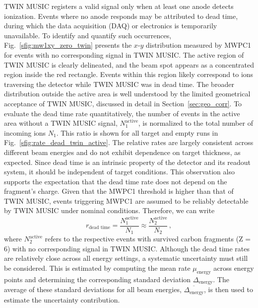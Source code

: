 \begin{appendices}
TWIN MUSIC registers a valid signal only when at least one anode detects ionization. Events where no anode responds may be attributed to dead time, during which the data acquisition (DAQ) or electronics is temporarily unavailable.
To identify and quantify such occurrences, Fig.~\ref{sfig:mw1xy_zero_twin} presents the $x$-$y$ distribution measured by MWPC1 for events with no corresponding signal in TWIN MUSIC. The active region of TWIN MUSIC is clearly delineated, and the beam spot appears as a concentrated region inside the red rectangle. Events within this region likely correspond to ions traversing the detector while TWIN MUSIC was in dead time. The broader distribution outside the active area is well understood by the limited geometrical acceptance of TWIN MUSIC, discussed in detail in Section~\ref{sec:geo_corr}.
To evaluate the dead time rate quantitatively, the number of events in the active area without a TWIN MUSIC signal, $N_1^{\text{active}}$, is normalized to the total number of incoming ions $N_1$. This ratio is shown for all target and empty runs in Fig.~\ref{sfig:rate_dead_twin_active}. The relative rates are largely consistent across different beam energies and do not exhibit dependence on target thickness, as expected. Since dead time is an intrinsic property of the detector and its readout system, it should be independent of target conditions.
This observation also supports the expectation that the dead time rate does not depend on the fragment's charge. Given that the MWPC1 threshold is higher than that of TWIN MUSIC, events triggering MWPC1 are assumed to be reliably detectable by TWIN MUSIC under nominal conditions. Therefore, we can write
\begin{equation*}
r_{\text{dead time}} = \frac{N_1^{\text{active}}}{N_1} \approx \frac{N_2^{\text{active}}}{N_2} \, , 
\end{equation*}
where $N_2^{\text{active}}$ refers to the respective events with survived carbon fragments (Z = 6) with no corresponding signal in TWIN MUSIC.
Although the dead time rates are relatively close across all energy settings, a systematic uncertainty must still be considered. This is estimated by computing the mean rate $\mu_{\text{energy}}$ across energy points and determining the corresponding standard deviation $\Delta_{\text{energy}}$. The average of these standard deviations for all beam energies, $\overline{\Delta_{\text{energy}}}$, is then used to estimate the uncertainty contribution.


\end{appendices}
